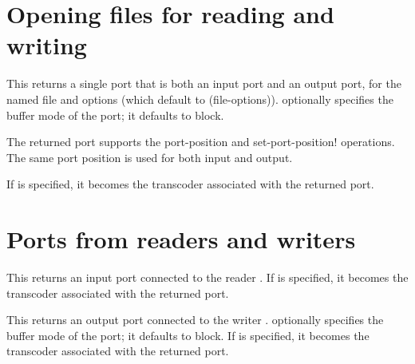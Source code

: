 \section{Opening files for reading and writing}

\begin{entry}{%
}
   
This returns a single port that is both an input port and an output
port, for the named file and options (which default to {\cf
  (file-options)}).   optionally specifies the buffer
mode of the port; it defaults to {\cf block}.
   
The returned port supports the {\cf port-position} and {\cf
  set-port-position!}  operations. The same port position is used for
both input and output.

If  is specified, it becomes the transcoder associated
with the returned port.
\end{entry}

\section{Ports from readers and writers}

\begin{entry}{%
}
   
This returns an input port connected to the reader .
If  is specified, it becomes the transcoder associated
with the returned port.
\end{entry}   

\begin{entry}{%
}
   
This returns an output port connected to the writer .
 optionally specifies the buffer mode of the port; it
defaults to {\cf block}.
If  is specified, it becomes the transcoder associated
with the returned port.
\end{entry}

